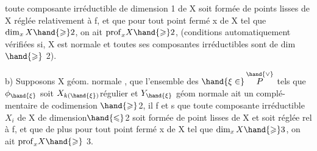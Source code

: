 

toute composante irréductible  de dimension 1  de X soit 
formée de points lisses de X   réglée relativement à f, et que
pour tout point fermé  x de X tel que $\dim_x X \hand{\geqslant} 2$, on ait $\mathrm{prof}_x X \hand{\geqslant} 2$,
(conditions automatiquement vérifiées si, X est  normale et toutes ses
composantes irréductibles sont de dim$\hand{\geqslant}$ 2).

b) Supposons X géom. normale ,  que l'ensemble  des $\hand{\xi \in}\, \overset{\hand{\vee}}{P}$
tels que $\phi_{\hand{\xi}}$ soit $X_{k(\hand{\xi})}$\hand{-}régulier et $Y_{\hand{\xi}}$  géom normale ait un complé-%
mentaire de codimension $\hand{\geqslant}$2, il f et s que  toute composante
irréductible $X_i$ de X de dimension$\hand{\leqslant}$2 soit formée de point lisses de
X et soit réglée rel à f, et que de plus pour tout point fermé x de X
tel que $\dim_x X \hand{\geqslant} 3$, on ait $\mathrm{prof}_x X \hand{\geqslant}$ 3.


